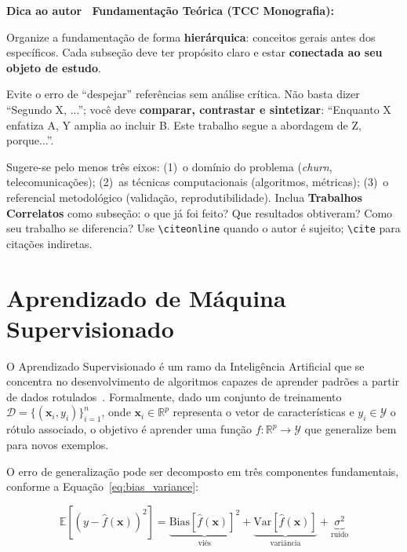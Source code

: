 \documentclass[
    12pt,
    oneside,
    a4paper,
    english,
    brazilian
    ]{abntex2}
\numberwithin{equation}{chapter}
\newenvironment{dica}{%
    \par\medskip
    \color{blue!60!black}\small\itshape
}{%
    \par\medskip
}
\begin{document}
\begin{dica}
\noindent\textbf{Dica ao autor \textemdash\ Fundamentação Teórica (TCC Monografia):}

Organize a fundamentação de forma \textbf{hierárquica}: conceitos gerais antes dos específicos. Cada subseção deve ter propósito claro e estar \textbf{conectada ao seu objeto de estudo}.

Evite o erro de ``despejar'' referências sem análise crítica. Não basta dizer ``Segundo X, ...''; você deve \textbf{comparar, contrastar e sintetizar}: ``Enquanto X enfatiza A, Y amplia ao incluir B. Este trabalho segue a abordagem de Z, porque...''.

Sugere-se pelo menos três eixos: (1)~o domínio do problema (\textit{churn}, telecomunicações); (2)~as técnicas computacionais (algoritmos, métricas); (3)~o referencial metodológico (validação, reprodutibilidade). Inclua \textbf{Trabalhos Correlatos} como subseção: o que já foi feito? Que resultados obtiveram? Como seu trabalho se diferencia? Use \texttt{\textbackslash citeonline{}} quando o autor é sujeito; \texttt{\textbackslash cite{}} para citações indiretas.
\end{dica}

\section{Aprendizado de Máquina Supervisionado}

O Aprendizado Supervisionado é um ramo da Inteligência Artificial que se concentra no desenvolvimento de algoritmos capazes de aprender padrões a partir de dados rotulados~\cite{hastie2009}. Formalmente, dado um conjunto de treinamento $\mathcal{D} = \{(\mathbf{x}_i, y_i)\}_{i=1}^{n}$, onde $\mathbf{x}_i \in \mathbb{R}^p$ representa o vetor de características e $y_i \in \mathcal{Y}$ o rótulo associado, o objetivo é aprender uma função $f: \mathbb{R}^p \to \mathcal{Y}$ que generalize bem para novos exemplos.

O erro de generalização pode ser decomposto em três componentes fundamentais, conforme a Equação~\ref{eq:bias_variance}:

\begin{equation}
    \mathbb{E}[(y - \hat{f}(\mathbf{x}))^2] = \underbrace{\text{Bias}[\hat{f}(\mathbf{x})]^2}_{\text{viés}} + \underbrace{\text{Var}[\hat{f}(\mathbf{x})]}_{\text{variância}} + \underbrace{\sigma^2}_{\text{ruído}}
    \label{eq:bias_variance}
\end{equation}
\end{document}
